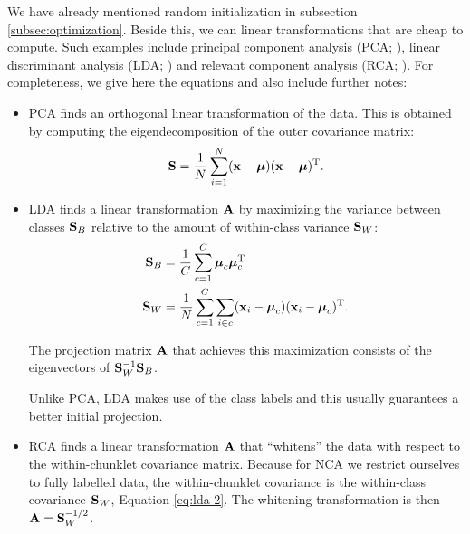     We have already mentioned random initialization in subsection \ref{subsec:optimization}. Beside this, we can linear transformations that are cheap to compute. Such examples include  principal component analysis (PCA; \citealp{pearson1901}), linear discriminant analysis (LDA; \citealp{fisher1936}) and relevant component analysis (RCA; \citealp{bar2003}). For completeness, we give here the equations and also include further notes:
        \begin{itemize}
            \item  PCA finds an orthogonal linear
                transformation of the data. This is
                obtained by computing the
                eigendecomposition of the outer covariance
                matrix:
                \begin{align}
                    \mathbf{S} = \frac{1}{N}\sum_{i=1}^N (\mathbf{x}-\mbox{\boldmath $\mu$})(\mathbf{x}-\mbox{\boldmath $\mu$})^\textrm{T}.
                    \label{eq:pca-1}
                \end{align}

            \item LDA finds a linear transformation $\mathbf{A}$ by maximizing the
variance between classes $\mathbf{S}_B$ relative to the amount of within-class variance
$\mathbf{S}_W$:
            \begin{align}
             \mathbf{S}_B &=
\frac{1}{C}\sum_{c=1}^{C}\boldsymbol\mu_c\boldsymbol\mu_c^\textrm{T}\label{eq:lda-1}\\
             \mathbf{S}_W &= \frac{1}{N}\sum_{c=1}^{C}\sum_{i \in
c}(\mathbf{x}_i-\boldsymbol{\mbox{\boldmath $\mu$}}_c)(\mathbf{x}_i-\boldsymbol{\mu}_c)^\textrm{T}.\label{eq:lda-2}
            \end{align}

            The projection matrix $\mathbf{A}$ that achieves this maximization consists
of the eigenvectors of $\mathbf{S}_W^{-1}\mathbf{S}_B$.

            Unlike PCA, LDA makes use of the class labels and this
usually guarantees a better initial projection.

            \item RCA finds a linear transformation $\mathbf{A}$
                that ``whitens'' the data with respect to
                the within-chunklet covariance matrix.
                Because for NCA we restrict ourselves to
                fully labelled data, the within-chunklet
                covariance is the within-class covariance
                $\mathbf{S}_W$, Equation \ref{eq:lda-2}. The
                whitening transformation is then
                $\mathbf{A}=\mathbf{S}_W^{-1/2}$.
        \end{itemize}

